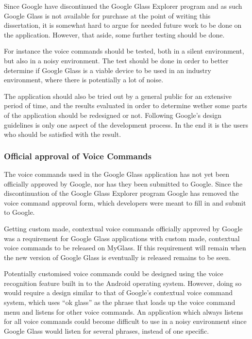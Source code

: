 Since Google have discontinued the Google Glass Explorer program and as such Google Glass is not available for purchase at the point of writing this dissertation, it is somewhat hard to argue for needed future work to be done on the application. However, that aside, some further testing should be done.

For instance the voice commands should be tested, both in a silent environment, but also in a noisy environment. The test should be done in order to better determine if Google Glass is a viable device to be used in an industry environment, where there is potentially a lot of noise. 

The application should also be tried out by a general public for an extensive period of time, and the results evaluated in order to determine wether some parts of the application should be redesigned or not. Following Google's design guidelines is only one aspect of the development process. In the end it is the users who should be satisfied with the result.

\subsubsection{Official approval of Voice Commands}
The voice commands used in the Google Glass application has not yet been officially approved by Google, nor has they been submitted to Google. Since the discontinuation of the Google Glass Explorer program Google has removed the voice command approval form, which developers were meant to fill in and submit to Google.

Getting custom made, contextual voice commands officially approved by Google was a requirement for Google Glass applications with custom made, contextual voice commands to be released on MyGlass. If this requirement will remain when the new version of Google Glass is eventually is released remains to be seen.

Potentially customised voice commands could be designed using the voice recognition feature built in to the Android operating system. However, doing so would require a design similar to that of Google's contextual voice command system, which uses ``ok glass'' as the phrase that loads up the voice command menu and listens for other voice commands. An application which always listens for all voice commands could become difficult to use in a noisy environment since Google Glass would listen for several phrases, instead of one specific.


